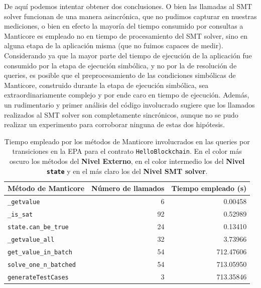 De aquí podemos intentar obtener dos conclusiones.
O bien las llamadas al SMT solver funcionan de una manera asincrónica, que no pudimos capturar en nuestras mediciones, o bien en efecto la mayoría del tiempo consumido por consultas a Manticore es empleado no en tiempo de procesamiento del SMT solver, sino en alguna etapa de la aplicación misma (que no fuimos capaces de medir).
Considerando ya que la mayor parte del tiempo de ejecución de la aplicación fue consumido por la etapa de ejecución simbólica, y no por la de resolución de queries, es posible que el preprocesamiento de las condiciones simbólicas de Manticore, construido durante la etapa de ejecución simbólica, sea extraordinariamente complejo y por ende caro en tiempo de ejecución.
Además, un rudimentario y primer análisis del código involucrado sugiere que los llamados realizados al SMT solver son completamente sincrónicos, aunque no se pudo realizar un experimento para corroborar ninguna de estas dos hipótesis.



\begin{table}[ht]
    \centering
    \begin{tabular}{l @{\hskip 30pt} r @{\hskip 30pt} r}
        \toprule
        \textbf{Método de Manticore}                      & \textbf{Número de llamados} & \textbf{Tiempo empleado (s)} \\
        \midrule
        \rowcolor{color1} \texttt{\_getvalue}             & 6                           & 0.00458                      \\
        \rowcolor{color1} \texttt{\_is\_sat}              & 92                          & 0.52989                      \\
        \rowcolor{color2} \texttt{state.can\_be\_true}    & 24                          & 0.13410                      \\
        \rowcolor{color1} \texttt{\_getvalue\_all}        & 32                          & 3.73966                      \\
        \rowcolor{color2} \texttt{get\_value\_in\_batch}  & 54                          & 712.47606                    \\
        \rowcolor{color2} \texttt{solve\_one\_n\_batched} & 54                          & 713.05950                    \\
        \rowcolor{color3} \texttt{generateTestCases}      & 3                           & 713.35846                    \\
        \bottomrule
    \end{tabular}
    \caption{Tiempo empleado por los métodos de Manticore involucrados en las queries por transiciones en la EPA para el contrato \texttt{HelloBlockchain}. En el color más oscuro los métodos del \textbf{Nivel Externo}, en el color intermedio los del \textbf{Nivel \texttt{state}} y en el más claro los del \textbf{Nivel SMT solver}.}
    \label{tab:performance}
\end{table}
